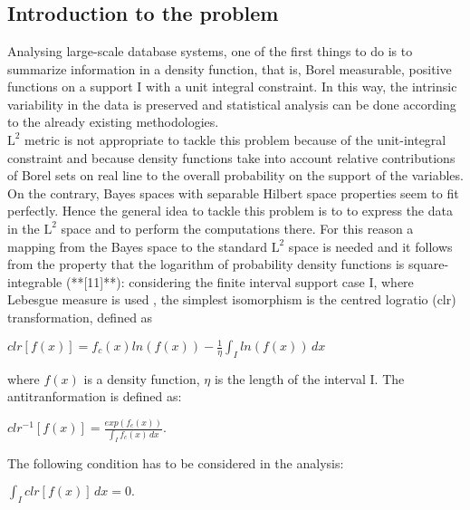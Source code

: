 \chapter{}
\newtheorem*{definition}{Definition}
\label{Introduzione}
\noindent 
\section{Introduction to the problem}
Analysing large-scale database systems, one of the first things to do is to summarize information in a density function, that is, Borel measurable, positive functions on a support I with a unit integral constraint. In this way, the intrinsic variability in the data is preserved and statistical analysis can be done according to the already existing methodologies. \\
$\text{L}^2$ metric is not appropriate to tackle this problem because of the unit-integral constraint and because density functions take into account relative contributions of Borel sets on real line to the overall probability on the support of the variables. \\
On the contrary, Bayes spaces with separable Hilbert space properties seem to fit perfectly. 
Hence the general idea to tackle this problem is to to express the data in the $\text{L}^2$ space  and to perform the computations there. For this reason a mapping  from the Bayes space to the standard $\text{L}^2$ space is needed and it follows from the property that the logarithm of probability density functions is square-integrable (**[11]**): considering the finite interval support case I, where Lebesgue measure is used , the simplest isomorphism is the centred logratio (clr) transformation, defined as 
\begin{center}
	\begin{math}
	clr[f(x)]= f_c(x) ln(f(x)) - \frac{1}{\eta}\int_{I} ln(f(x))\, dx
	\end{math}
\end{center}
where $f(x)$ is a density function, $\eta$ is the length of the interval I.
The antitranformation is defined as: 
\begin{center}
	\begin{math}
	clr^{-1}[f(x)]= \frac{exp(f_c(x))}{\int_{I} f_c(x)\, dx}.
	\end{math}
\end{center}
 The following condition has to be considered in the analysis:
 \begin{center}
 	\begin{math}
 	\int_{I} clr[f(x)]\, dx = 0.
 	\end{math}
 \end{center}


